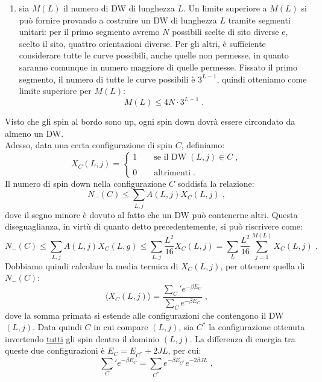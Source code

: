 \documentclass[10pt,a4paper]{report}
\theoremstyle{definition}
\numberwithin{equation}{section}
\newcommand{\bra}{\langle}
\newcommand{\ket}{\rangle}
\begin{document}
\begin{itemize}
\begin{enumerate}
\item sia $M(L)$ il numero di DW di lunghezza $L$. Un limite superiore a $M(L)$ si può fornire provando a costruire un DW di lunghezza $L$ tramite segmenti unitari: per il primo segmento avremo $N$ possibili scelte di sito diverse e, scelto il sito, quattro orientazioni diverse. Per gli altri, è sufficiente considerare tutte le curve possibili, anche quelle non permesse, in quanto saranno comunque in numero maggiore di quelle permesse. Fissato il primo segmento, il numero di tutte le curve possibili è $3^{L-1}$, quindi otteniamo come limite superiore per $M(L)$:
\begin{equation}
M(L)\le 4N\cdot 3^{L-1}\;.
\end{equation}
\end{enumerate}
Visto che gli spin al bordo sono up, ogni spin down dovrà essere circondato da almeno un DW. \\
Adesso, data una certa configurazione di spin $C$, definiamo:
\begin{equation}
X_C(L,j)=\begin{cases}
1\qquad\mbox{se il DW}\; (L,j)\in C\;, \\
\\
0\qquad \mbox{altrimenti}\;.
\end{cases}
\end{equation}
Il numero di spin down nella configurazione $C$ soddisfa la relazione:
\begin{equation}
N_-(C)\le \sum_{L,j}A(L,j)X_C(L,j)\;,
\end{equation}
dove il segno minore è dovuto al fatto che un DW può contenerne altri. Questa diseguaglianza, in virtù di quanto detto precedentemente, si può riscrivere come:
\begin{equation}
N_-(C) \le \sum_{L,j}A(L,j)X_C(L,g) \le \sum_{L,j}\frac{L^2}{16}X_C(L,j) =\sum_L\frac{L^2}{16}\sum_{j=1}^{M(L)}X_C(L,j)\;.
\end{equation}
Dobbiamo quindi calcolare la media termica di $X_C(L,j)$, per ottenere quella di $N_-(C)$:
\begin{equation}
\bra X_C(L,j)\ket=\frac{\sum_C' e^{-\beta E_C}}{\sum_C e^{-\beta E_C}}\;,
\end{equation}
dove la somma primata si estende alle configurazioni che contengono il DW $(L,j)$. Data quindi $C$ in cui compare $(L,j)$, sia $C^*$ la configurazione ottenuta invertendo \underline{tutti} gli spin dentro il dominio $(L,j)$. La differenza di energia tra queste due configurazioni è $E_C=E_{C^*}+2JL$, per cui:
$$
\sum_C{}'e^{-\beta E_C}=\sum_{C^*}e^{-\beta E_{C^*}}e^{-2\beta JL}\;,
$$
\end{itemize}
\end{document}
